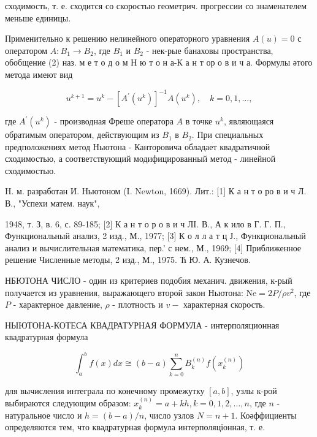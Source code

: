 \documentclass[10pt]{article}
\begin{document}
сходимость, т. е. сходится со скоростью геометрич. прогрессии со знаменателем меньше единицы.



Применительно к решению нелинейного операторного уравнения $A(u)=0$ с оператором $A: B_{1} \rightarrow B_{2}$, где $B_{1}$ и $B_{2}$ - нек-рые банаховы пространства, обобщение (2) наз. м е т о д о м Н ю т о н а-К а н т ор о в и ч а. Формулы әтого метода имеют вид



\[

u^{k+1}=u^{k}-\left[A^{\prime}\left(u^{k}\right)\right]^{-1} A\left(u^{k}\right), \quad k=0,1, \ldots,

\]



где $A^{\prime}\left(u^{k}\right)$ - производная Фреше оператора $A$ в точке $u^{k}$, являющаяся обратимым оператором, действующим из $B_{1}$ в $B_{2}$. При специальных предположениях метод Ньютона - Канторовича обладает квадратичной сходимостью, а соответствующий модифицированный метод - линейной сходимостью.



H. м. разработан И. Ньютоном (I. Newton, 1669). Лит.: [1] К а н т о ро в и ч Л. В., "Успехи матем. наук",

1948, т. З, в. 6, с. 89-185; [2] К а н т о р о в и ч ЛI. В., А к ило в Г. Г. П., Функциональный анализ, 2 изд., М., 1977; [3] К о л л а т ц Ј., Функциональный анализ и вычислительная математика, пер.' с нем., М., 1969; [4] Приближенное решение Численные методы, 2 изд., М., 1975. Ћ Ю. А. Кузнечов.



НБЮТОНА ЧИСЛО - один из критериев подобия механич. движения, к-рый получается из уравнения, выражающего второй закон Ньютона: $\mathrm{Ne}=2 P / \rho v^{2}$, где $P$ - характерное давление, $\rho$ - плотность и $v-$ характерная скорость.



НЫЮТОНА-КОТЕСА КВАДРАТУРНАЯ ФОРМУЛА - интерполяционная квадратурная формула



\[

\int_{a}^{b} f(x) d x \cong(b-a) \sum_{k=0}^{n} B_{k}^{(n)} f\left(x_{k}^{(n)}\right)

\]



для вычисления интеграла по конечному промежутку $[a, b]$, узлы к-рой выбираются следующим образом: $x_{k}^{(n)}=a+k h, k=0,1,2, \ldots, n$, где $n$ - натуральное число и $h=(b-a) / n$, число узлов $N=n+1$. Коәффициенты определяются тем, что квадратурная формула интерполяціонная, т. е.
\end{document}
